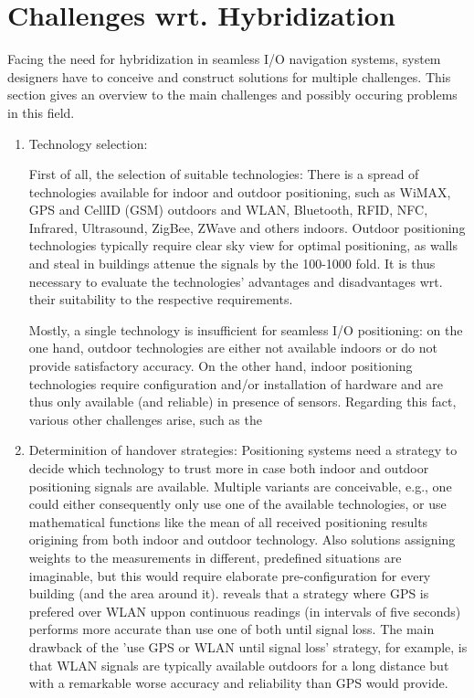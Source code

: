 \chapter{Challenges wrt. Hybridization}

Facing the need for hybridization in seamless I/O navigation systems, system designers have to conceive and construct solutions for multiple challenges. This section gives an overview to the main challenges and possibly occuring problems in this field.

\begin{enumerate}
	\item Technology selection:

	First of all, the selection of suitable technologies: 
	There is a spread of technologies available for indoor and outdoor positioning, such as WiMAX, GPS and CellID (GSM) outdoors and WLAN, Bluetooth, RFID, NFC, Infrared, Ultrasound, ZigBee, ZWave and others indoors. Outdoor positioning technologies typically require clear sky view for optimal positioning, as walls and steal in buildings attenue the signals by the 100-1000 fold.
	It is thus necessary to evaluate the technologies' advantages and disadvantages wrt. their suitability to the respective requirements.
	
	Mostly, a single technology is insufficient for seamless I/O positioning: on the one hand, outdoor technologies are either not available indoors or do not provide satisfactory accuracy. On the other hand, indoor positioning technologies require configuration and/or installation of hardware and are thus only available (and reliable) in presence of sensors.
	Regarding this fact, various other challenges arise, such as the

	
	\item Determinition of handover strategies:
	Positioning systems need a strategy to decide which technology to trust more in case both indoor and outdoor positioning signals are available. Multiple variants are conceivable, e.g., one could either consequently only use one of the available technologies, or use mathematical functions like the mean of all received positioning results origining from both indoor and outdoor technology. Also solutions assigning weights to the measurements in different, predefined situations are imaginable, but this would require elaborate pre-configuration for every building (and the area around it).
	\cite{streamspin} reveals that a strategy where GPS is prefered over WLAN uppon continuous readings (in intervals of five seconds) performs more accurate than use one of both until signal loss.
	The main drawback of the 'use GPS or WLAN until signal loss' strategy, for example, is that WLAN signals are typically available outdoors for a long distance but with a remarkable worse accuracy and reliability than GPS would provide.
	

\end{enumerate}

